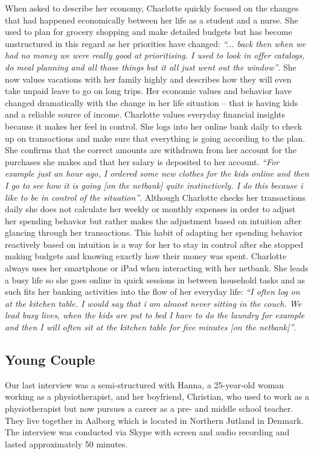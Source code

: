 When asked to describe her economy, Charlotte quickly focused on the changes that had happened economically between her life as a student and a nurse. She used to plan for grocery shopping and make detailed budgets but has become unstructured in this regard as her priorities have changed: \emph{“... back then when we had no money we were really good at prioritising. I used to look in offer catalogs, do meal planning and all those things but it all just went out the window”}. She now values vacations with her family highly and describes how they will even take unpaid leave to go on long trips. Her economic values and behavior have changed dramatically with the change in her life situation -- that is having kids and a reliable source of income.
Charlotte values everyday financial insights because it makes her feel in control. She logs into her online bank daily to check up on transactions and make sure that everything is going according to the plan. She confirms that the correct amounts are withdrawn from her account for the purchases she makes and that her salary is deposited to her account. \emph{“For example just an hour ago, I ordered some new clothes for the kids online and then I go to see how it is going [on the netbank] quite instinctively. I do this because i like to be in control of the situation”}. Although Charlotte checks her transactions daily she does not calculate her weekly or monthly expenses in order to adjust her spending behavior but rather makes the adjustment based on intuition after glancing through her transactions. This habit of adapting her spending behavior reactively based on intuition is a way for her to stay in control after she stopped making budgets and knowing exactly how their money was spent.
Charlotte always uses her smartphone or iPad when interacting with her netbank. She leads a busy life so she goes online in quick sessions in between household tasks and as such fits her banking activities into the flow of her everyday life: \emph{“I often log on at the kitchen table. I would say that i am almost never sitting in the couch. We lead busy lives, when the kids are put to bed I have to do the laundry for example and then I will often sit at the kitchen table for five minutes [on the netbank]”}.

\subsection{Young Couple}
Our last interview was a semi-structured with Hanna, a 25-year-old woman working as a physiotherapist, and her boyfriend, Christian, who used to work as a physiotherapist but now pursues a career as a pre- and middle school teacher. They live together in Aalborg which is located in Northern Jutland in Denmark. The interview was conducted via Skype with screen and audio recording and lasted approximately 50 minutes.\\

